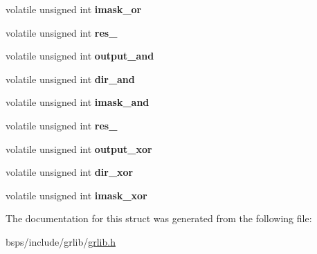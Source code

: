 \begin{DoxyCompactItemize}
volatile unsigned int {\bfseries imask\+\_\+or}
\item 
\mbox{\label{structgrgpio__regs_addf20dddaa0642b713e132f22d12cd70}} 
volatile unsigned int {\bfseries res\+\_}
\item 
\mbox{\label{structgrgpio__regs_a17c262e07a2d3954ae39587030e1fc64}} 
volatile unsigned int {\bfseries output\+\_\+and}
\item 
\mbox{\label{structgrgpio__regs_a9c9cd5d0553f07a2d7c65aeadb78572f}} 
volatile unsigned int {\bfseries dir\+\_\+and}
\item 
\mbox{\label{structgrgpio__regs_a011b97c5d9073316187556bdbf942254}} 
volatile unsigned int {\bfseries imask\+\_\+and}
\item 
\mbox{\label{structgrgpio__regs_a006a9fe4f60d3ad83a9e8352c40f079b}} 
volatile unsigned int {\bfseries res\+\_}
\item 
\mbox{\label{structgrgpio__regs_ab98624936c8a5241b91122908245f45d}} 
volatile unsigned int {\bfseries output\+\_\+xor}
\item 
\mbox{\label{structgrgpio__regs_a41bf0e5fabcb8a72f8588f46fcec909e}} 
volatile unsigned int {\bfseries dir\+\_\+xor}
\item 
\mbox{\label{structgrgpio__regs_ad38fc02236c957442fff0de21e42d08a}} 
volatile unsigned int {\bfseries imask\+\_\+xor}
\end{DoxyCompactItemize}


The documentation for this struct was generated from the following file\+:\begin{DoxyCompactItemize}
\item 
bsps/include/grlib/\mbox{\hyperlink{grlib_8h}{grlib.\+h}}\end{DoxyCompactItemize}

